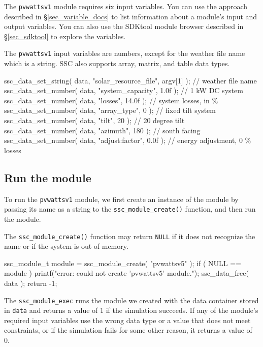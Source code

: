 \documentclass{scrartcl} %
\begin{document}
The \texttt{pvwattsv1} module requires six input variables. You can use the approach described in \S\ref{sec_variable_docs} to list information about a module's input and output variables. You can also use the SDKtool module browser described in \S\ref{sec_sdktool} to explore the variables.

The \texttt{pvwattsv1} input variables are numbers, except for the weather file name which is a string. SSC also supports array, matrix, and table data types.

\begin{verbatimtab}[4]
	ssc_data_set_string( data, "solar_resource_file", argv[1] ); // weather file name
	ssc_data_set_number( data, "system_capacity", 1.0f );  // 1 kW DC system
	ssc_data_set_number( data, "losses", 14.0f );      // system losses, in \%
	ssc_data_set_number( data, "array_type", 0 );      // fixed tilt system
	ssc_data_set_number( data, "tilt", 20 );           // 20 degree tilt
	ssc_data_set_number( data, "azimuth", 180 );       // south facing
	ssc_data_set_number( data, "adjust:factor", 0.0f ); // energy adjustment, 0 \% losses
\end{verbatimtab}

\subsection{Run the module}
\label{sec_run_module}

To run the \texttt{pvwattsv1} module, we first create an instance of the module by passing its name as a string to the \texttt{ssc\_module\_create()} function, and then run the module. 

The \texttt{ssc\_module\_create()} function may return \texttt{NULL} if it does not recognize the name or if the system is out of memory.

\begin{verbatimtab}[4]
	ssc_module_t module = ssc_module_create( "pvwattsv5" );
	if ( NULL == module )
	{
		printf("error: could not create 'pvwattsv5' module.\n");
		ssc_data_free( data );
		return -1;
	}
\end{verbatimtab}

The \texttt{ssc\_module\_exec} runs the module we created with the data container stored in \texttt{data} and returns a value of 1 if the simulation succeeds. If any of the module's required input variables use the wrong data type or a value that does not meet constraints, or if the simulation fails for some other reason, it returns a value of 0.
\end{document}
